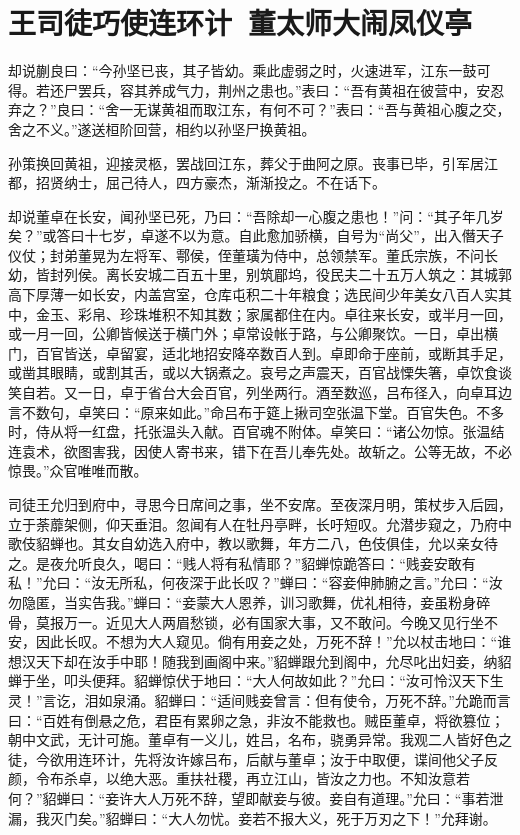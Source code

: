\chapter{王司徒巧使连环计~董太师大闹凤仪亭}

却说蒯良曰：“今孙坚已丧，其子皆幼。乘此虚弱之时，火速进军，江东一鼓可得。若还尸罢兵，容其养成气力，荆州之患也。”表曰：“吾有黄祖在彼营中，安忍弃之？”良曰：“舍一无谋黄祖而取江东，有何不可？”表曰：“吾与黄祖心腹之交，舍之不义。”遂送桓阶回营，相约以孙坚尸换黄祖。

孙策换回黄祖，迎接灵柩，罢战回江东，葬父于曲阿之原。丧事已毕，引军居江都，招贤纳士，屈己待人，四方豪杰，渐渐投之。不在话下。

却说董卓在长安，闻孙坚已死，乃曰：“吾除却一心腹之患也！”问：“其子年几岁矣？”或答曰十七岁，卓遂不以为意。自此愈加骄横，自号为“尚父”，出入僭天子仪仗；封弟董晃为左将军、鄠侯，侄董璜为侍中，总领禁军。董氏宗族，不问长幼，皆封列侯。离长安城二百五十里，别筑郿坞，役民夫二十五万人筑之：其城郭高下厚薄一如长安，内盖宫室，仓库屯积二十年粮食；选民间少年美女八百人实其中，金玉、彩帛、珍珠堆积不知其数；家属都住在内。卓往来长安，或半月一回，或一月一回，公卿皆候送于横门外；卓常设帐于路，与公卿聚饮。一日，卓出横门，百官皆送，卓留宴，适北地招安降卒数百人到。卓即命于座前，或断其手足，或凿其眼睛，或割其舌，或以大锅煮之。哀号之声震天，百官战慄失箸，卓饮食谈笑自若。又一日，卓于省台大会百官，列坐两行。酒至数巡，吕布径入，向卓耳边言不数句，卓笑曰：“原来如此。”命吕布于筵上揪司空张温下堂。百官失色。不多时，侍从将一红盘，托张温头入献。百官魂不附体。卓笑曰：“诸公勿惊。张温结连袁术，欲图害我，因使人寄书来，错下在吾儿奉先处。故斩之。公等无故，不必惊畏。”众官唯唯而散。

司徒王允归到府中，寻思今日席间之事，坐不安席。至夜深月明，策杖步入后园，立于荼蘼架侧，仰天垂泪。忽闻有人在牡丹亭畔，长吁短叹。允潜步窥之，乃府中歌伎貂蝉也。其女自幼选入府中，教以歌舞，年方二八，色伎俱佳，允以亲女待之。是夜允听良久，喝曰：“贱人将有私情耶？”貂蝉惊跪答曰：“贱妾安敢有私！”允曰：“汝无所私，何夜深于此长叹？”蝉曰：“容妾伸肺腑之言。”允曰：“汝勿隐匿，当实告我。”蝉曰：“妾蒙大人恩养，训习歌舞，优礼相待，妾虽粉身碎骨，莫报万一。近见大人两眉愁锁，必有国家大事，又不敢问。今晚又见行坐不安，因此长叹。不想为大人窥见。倘有用妾之处，万死不辞！”允以杖击地曰：“谁想汉天下却在汝手中耶！随我到画阁中来。”貂蝉跟允到阁中，允尽叱出妇妾，纳貂蝉于坐，叩头便拜。貂蝉惊伏于地曰：“大人何故如此？”允曰：“汝可怜汉天下生灵！”言讫，泪如泉涌。貂蝉曰：“适间贱妾曾言：但有使令，万死不辞。”允跪而言曰：“百姓有倒悬之危，君臣有累卵之急，非汝不能救也。贼臣董卓，将欲篡位；朝中文武，无计可施。董卓有一义儿，姓吕，名布，骁勇异常。我观二人皆好色之徒，今欲用连环计，先将汝许嫁吕布，后献与董卓；汝于中取便，谍间他父子反颜，令布杀卓，以绝大恶。重扶社稷，再立江山，皆汝之力也。不知汝意若何？”貂蝉曰：“妾许大人万死不辞，望即献妾与彼。妾自有道理。”允曰：“事若泄漏，我灭门矣。”貂蝉曰：“大人勿忧。妾若不报大义，死于万刃之下！”允拜谢。

